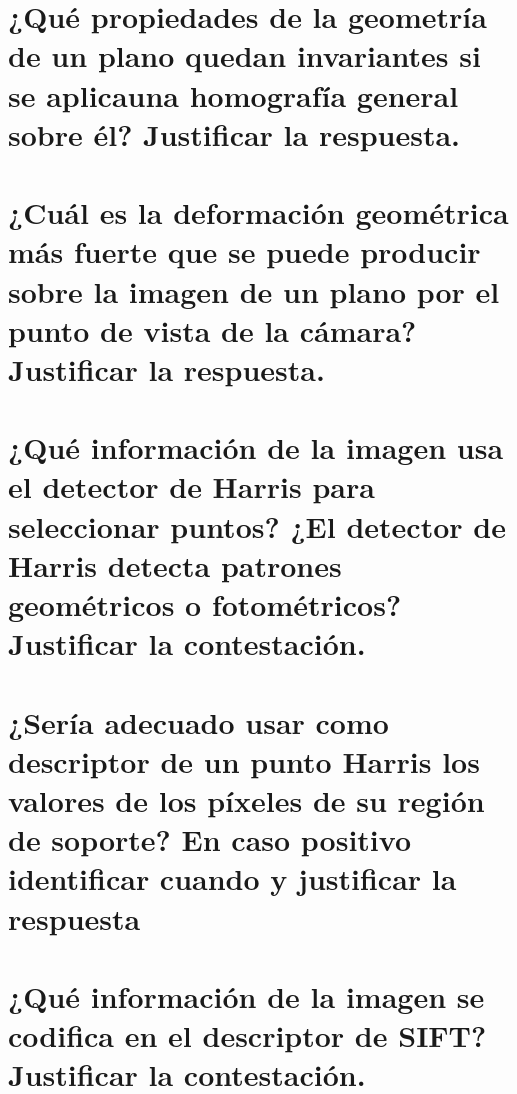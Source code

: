 \section{¿Qué propiedades de la geometría de un plano quedan invariantes si se aplicauna homografía general sobre él?
 Justificar la respuesta.}

\section{¿Cuál es la deformación geométrica más fuerte que se puede producir sobre
la imagen de un plano por el punto de vista de la cámara? Justificar la respuesta.}


\section{¿Qué información de la imagen usa el detector de Harris para seleccionar
puntos? ¿El detector de Harris detecta patrones geométricos o fotométricos?
Justificar la contestación.}


\section{¿Sería adecuado usar como descriptor de un punto Harris los valores de
los píxeles de su región de soporte? En caso positivo identificar cuando y
justificar la respuesta}


\section{¿Qué información de la imagen se codifica en el descriptor de SIFT?
Justificar la contestación.}

